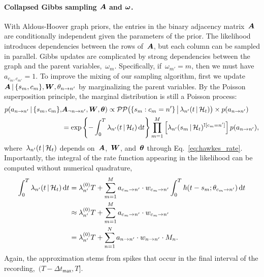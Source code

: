 \paragraph{Collapsed Gibbs sampling $\boldsymbol{A}$ and $\boldsymbol{\omega}$.}
With Aldous-Hoover graph priors, the entries in the binary adjacency
matrix~$\boldsymbol{A}$ are conditionally independent given the parameters of the
prior. The likelihood introduces dependencies between the rows
of~$\boldsymbol{A}$, but each column can be sampled in parallel. Gibbs updates
are complicated by strong dependencies between the graph and the
parent variables,~$\omega_m$. Specifically, if~${\omega_{m'}=m}$, then
we must have~${a_{c_{m},c_{m'}}=1}$. To improve the mixing of our
sampling algorithm, first we
update~${\boldsymbol{A}\,|\,\{s_m,c_m\},\boldsymbol{W},\theta_{n \to n'}}$ by marginalizing
the parent variables. By the Poisson superposition principle, the marginal
distribution is still a Poisson process:
\begin{align*}
  p(a_{n \to n'} \,|\, \{s_m, c_m\}, &\boldsymbol{A}_{\neg n \to n'}, \boldsymbol{W}, \boldsymbol{\theta}) 
  \propto \mathcal{PP} \big(\{s_m: c_m=n'\} \, \big| \, \lambda_{n'}(t \,|\, \mathcal{H}_t)\big)
  \times p(a_{n \to n'}) \\
  &= \exp \left \{ -\int_0^T \lambda_{n'}(t \,|\, \mathcal{H}_t) \, \mathrm{d}t \right\}
  \prod_{m=1}^M \left[ \lambda_{n'}(s_m \,|\, \mathcal{H}_t)^{\mathbb{I}[c_m=n']} \right]
  p(a_{n \to n'}),
\end{align*}
where~$\lambda_{n'}(t \,|\, \mathcal{H}_t)$ depends on~$\boldsymbol{A}$,~$\boldsymbol{W}$, and~$\boldsymbol{\theta}$
through Eq.~\ref{eq:hawkes_rate}.
Importantly, the integral of the rate function appearing in the
likelihood can be computed without numerical quadrature,
\begin{align*}
  \int_0^T \lambda_{n'}(t \,|\, \mathcal{H}_t) \, \mathrm{d}t
  &= \lambda^{(0)}_{n'} T +
  \sum_{m=1}^M a_{c_m \to n'} \cdot w_{c_m \to n'}
  \int_0^T  \hbar(t-s_m; \theta_{c_m \to n'}) \, \mathrm{d}t \\
  &\approx \lambda^{(0)}_{n'} T + \sum_{m=1}^M a_{c_m \to n'} \cdot w_{c_m \to n'} \\
  &= \lambda^{(0)}_{n'} T + \sum_{n=1}^N a_{n \to n'} \cdot w_{n \to n'} \cdot M_{n}.
\end{align*}
Again, the approximation stems from spikes that occur in the final
interval of the recording,~${(T-\Delta t_{\mathsf{max}}, T]}$.

